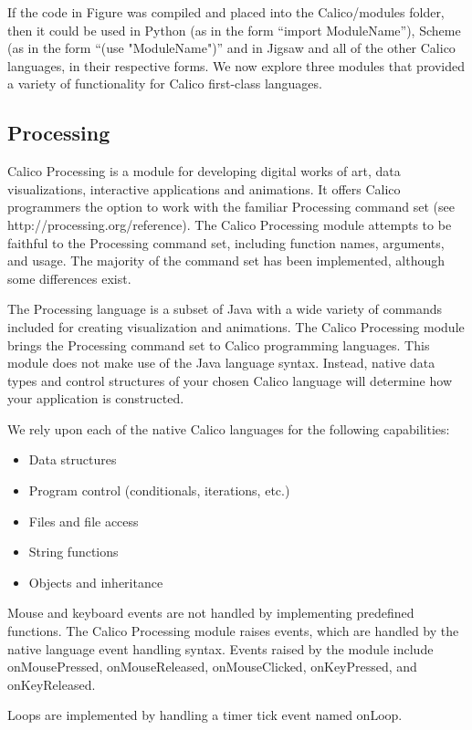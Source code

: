 \documentclass[preprint]{sigplanconf}
\begin{document}
If the code in Figure was compiled and placed into the Calico/modules
folder, then it could be used in Python (as in the form ``import
ModuleName''), Scheme (as in the form ``(use "ModuleName")'' and in
Jigsaw and all of the other Calico languages, in their respective
forms. We now explore three modules that provided a variety of
functionality for Calico first-class languages.

\subsection{Processing}

Calico Processing is a module for developing digital works of art,
data visualizations, interactive applications and animations. It
offers Calico programmers the option to work with the familiar
Processing command set (see http://processing.org/reference). The
Calico Processing module attempts to be faithful to the Processing
command set, including function names, arguments, and usage. The
majority of the command set has been implemented, although some
differences exist.

The Processing language is a subset of Java with a wide variety of
commands included for creating visualization and animations. The
Calico Processing module brings the Processing command set to Calico
programming languages. This module does not make use of the Java
language syntax. Instead, native data types and control structures of
your chosen Calico language will determine how your application is
constructed.

We rely upon each of the native Calico languages for the following capabilities:

\begin{itemize}
\item Data structures
\item Program control (conditionals, iterations, etc.)
\item Files and file access
\item String functions
\item Objects and inheritance
\end{itemize}

Mouse and keyboard events are not handled by implementing predefined
functions. The Calico Processing module raises events, which are
handled by the native language event handling syntax. Events raised by
the module include onMousePressed, onMouseReleased, onMouseClicked,
onKeyPressed, and onKeyReleased.

Loops are implemented by handling a timer tick event named onLoop.
\end{document}
